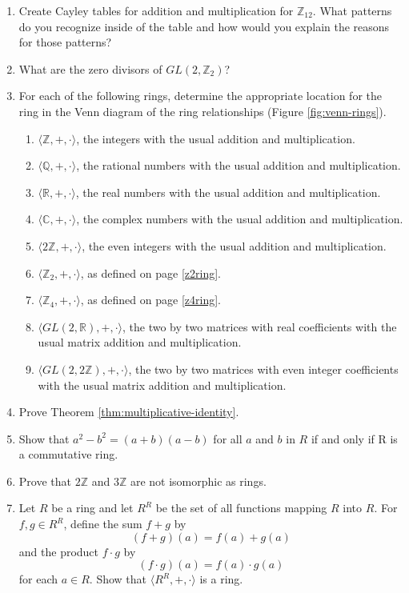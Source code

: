 \documentclass[
]{book}
\providecommand{\tightlist}{%
  \setlength{\itemsep}{0pt}\setlength{\parskip}{0pt}}
\theoremstyle{definition}
\theoremstyle{definition}
\theoremstyle{definition}
\theoremstyle{remark}
\begin{document}
\begin{enumerate}
\def\labelenumi{\arabic{enumi}.}
\item
  Create Cayley tables for addition and multiplication for \(\mathbb{Z}_{12}\). What patterns do you recognize inside of the table and how would you explain the reasons for those patterns?
\item
  What are the zero divisors of \(GL(2,\mathbb{Z}_2)\)?
\item
  For each of the following rings, determine the appropriate location for the ring in the Venn diagram of the ring relationships (Figure \ref{fig:venn-rings}).

  \begin{enumerate}
  \def\labelenumii{\alph{enumii}.}
  \tightlist
  \item
    \(\langle\mathbb{Z},+,\cdot\rangle\), the integers with the usual addition and multiplication.
  \item
    \(\langle\mathbb{Q},+,\cdot\rangle\), the rational numbers with the usual addition and multiplication.
  \item
    \(\langle\mathbb{R},+,\cdot\rangle\), the real numbers with the usual addition and multiplication.
  \item
    \(\langle\mathbb{C},+,\cdot\rangle\), the complex numbers with the usual addition and multiplication.
  \item
    \(\langle2\mathbb{Z},+,\cdot\rangle\), the even integers with the usual addition and multiplication.
  \item
    \(\langle\mathbb{Z}_2,+,\cdot\rangle\), as defined on page \ref{z2ring}.
  \item
    \(\langle\mathbb{Z}_4,+,\cdot\rangle\), as defined on page \ref{z4ring}.
  \item
    \(\langle GL(2,\mathbb{R}),+,\cdot\rangle\), the two by two matrices with real coefficients with the usual matrix addition and multiplication.
  \item
    \(\langle GL(2,2\mathbb{Z}),+,\cdot\rangle\), the two by two matrices with even integer coefficients with the usual matrix addition and multiplication.
  \end{enumerate}
\item
  Prove Theorem \ref{thm:multiplicative-identity}.
\item
  Show that \(a^2-b^2=(a+b)(a-b)\) for all \(a\) and \(b\) in \(R\) if and only if R is a commutative ring.
\item
  Prove that \(2\mathbb{Z}\) and \(3\mathbb{Z}\) are not isomorphic as rings.
\item
  Let \(R\) be a ring and let \(R^R\) be the set of all functions mapping \(R\) into \(R\). For \(f,g\in R^R\), define the sum \(f+g\) by \[(f+g)(a)=f(a)+g(a)\] and the product \(f\cdot g\) by \[(f\cdot g)(a)=f(a)\cdot g(a)\] for each \(a \in R\). Show that \(\langle R^R, +, \cdot\rangle\) is a ring.
\end{enumerate}
\end{document}
